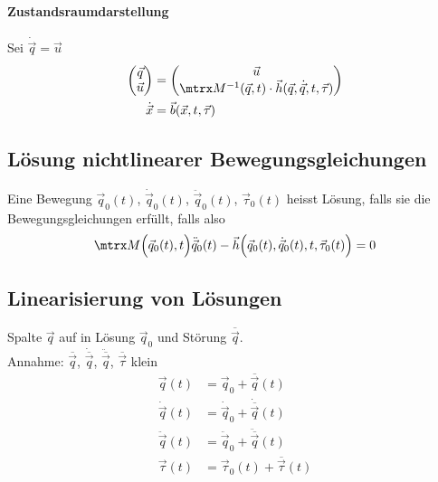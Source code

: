 		\paragraph{Zustandsraumdarstellung} %
			Sei $\dot{\vec q} = \vec u$
			\begin{align*}
				\begin{pmatrix}
					\vec q \\ \vec u
				\end{pmatrix} &= 
				\begin{pmatrix}
					\vec u \\ \mtrx M^{-1}(\vec q, t) \cdot \vec h(\vec q, \dot{\vec q}, t, \vec \tau)
				\end{pmatrix} \\
				\dot{\vec x} &= \vec b(\vec x, t, \vec \tau)
			\end{align*}
	
	\subsection{Lösung nichtlinearer Bewegungsgleichungen} %
		\begin{definition}
			Eine Bewegung $\vec q_0(t)$, $\dot{\vec q}_0(t)$, $\ddot{\vec q}_0(t)$, $\vec\tau_0(t)$ heisst Lösung, falls sie die Bewegungsgleichungen erfüllt, falls also
			\[
				\mtrx M\Big(\vec q_0(t), t\Big) \ddot{\vec q}_0(t) - \vec h\Big(\vec q_0(t),\dot{\vec q}_0(t), t, \vec\tau_0(t)\Big) = 0
			\]
		\end{definition}
	
	\subsection{Linearisierung von Lösungen} %
		Spalte $\vec q$ auf in Lösung $\vec q_0$ und Störung $\overline{\vec q}$. \\
		Annahme: $\overline{\vec q}$, $\dot{\overline{\vec q}}$, $\ddot{\overline{\vec q}}$, $\overline{\vec\tau}$ klein
		\begin{align*}
			\vec q(t) &= \vec q_0 + \overline{\vec q}(t) \\
			\dot{\vec q}(t) &= \dot{\vec q}_0 + \dot{\overline{\vec q}}(t) \\
			\ddot{\vec q}(t) &= \ddot{\vec q}_0 + \ddot{\overline{\vec q}}(t) \\
			\vec \tau(t) &= \vec \tau_0(t) + \overline{\vec \tau}(t)
		\end{align*}
		
